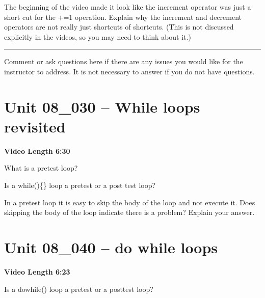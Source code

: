 \documentclass[letterpaper,12pt]{exam}
\newcommand{\unit}{Unit 08}
\begin{document}
\begin{questions}
\begin{samepage}
    \question The beginning of the video made it look like the increment operator was just a short cut for the +=1 operation.  Explain why the increment and decrement operators are not really just shortcuts of shortcuts.  (This is not discussed explicitly in the videos, so you may need to think about it.)
    \vspace{5mm}
\end{samepage}


\begin{samepage}
    \begin{center}
    \rule{0.8\textwidth}{.4pt}
    \end{center}
	\question Comment or ask questions here if there are any issues you would like for the instructor to address.  It is not necessary to answer if you do not have questions.
	\vspace{30mm}
\end{samepage}
\section*{\unit\_030 -- While loops revisited} %
\par{\selectfont\textbf{Video Length 6:30}}
\begin{samepage}
    \question What is a pretest loop?
    \vspace{5mm}
\end{samepage}

\begin{samepage}
    \question Is a while()\{\} loop a pretest or a post test loop?
    \vspace{5mm}
\end{samepage}
\begin{samepage}
    \question In a pretest loop it is easy to skip the body of the loop and not execute it.  Does skipping the body of the loop indicate there is a problem?  Explain your answer.
    \vspace{5mm}
\end{samepage}


\section*{\unit\_040 -- do while loops} 
\par{\selectfont\textbf{Video Length 6:23}}
\begin{samepage}
    \question Is a do{}while() loop a pretest or a posttest loop?
    \vspace{5mm}
\end{samepage}


\end{questions}
\end{document}
